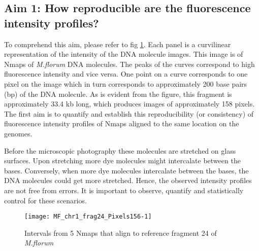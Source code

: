 \documentclass[11pt]{extarticle} %
\begin{document}
\subsection*{Aim 1: How reproducible are the fluorescence intensity profiles?}
To comprehend this aim, please refer to fig \ref{fig:Fig1}. Each panel is a curvilinear representation of the intensity of the DNA molecule images. This image is of Nmaps of {\emph{M.florum}} DNA molecules. The peaks of the curves correspond to high fluorescence intensity and vice versa. One point on a curve corresponds to one pixel on the image which in turn corresponds to approximately 200 base pairs (bp) of the DNA molecule. As is evident from the figure, this fragment is approximately 33.4 kb long, which produces images of approximately 158 pixels. The first aim is to quantify and establish this reproducibility (or consistency) of fluorescence intensity profiles of Nmaps aligned to the same location on the genomes. 

Before the microscopic photography these molecules are stretched on glass surfaces. Upon stretching more dye molecules might intercalate between the bases. Conversely, when more dye molecules intercalate between the bases, the DNA molecules could get more stretched. Hence, the observed intensity profiles are not free from errors. It is important to observe, quantify and statistically control for these scenarios.

\begin{figure}[H]
	\centering
	\texttt{[image: MF\_chr1\_frag24\_Pixels156-1]}
	\caption{Intervals from 5 Nmaps that align to reference fragment 24 of {\emph{M.florum}}}
	\label{fig:Fig1}
\end{figure}
\end{document}
